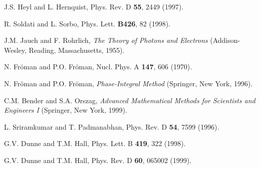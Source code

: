\documentclass[a4paper,prd,showpacs,preprintnumbers,amsmath,amssymb]{revtex4}
\begin{document}
\begin{references}
 J.S. Heyl and L. Hernquist, Phys. Rev. D {\bf 55},
2449 (1997).

 R. Soldati and L. Sorbo, Phys. Lett. {\bf B426}, 82
(1998).

 J.M. Jauch and F. Rohrlich, {\it The Theory of
Photons and Electrons} (Addison-Wesley, Reading, Massachusetts,
1955).

 N. Fr\"{o}man and P.O. Fr\"{o}man, Nucl. Phys. A
{\bf 147}, 606 (1970).

 N. Fr\"{o}man and P.O. Fr\"{o}man,
{\it Phase-Integral Method} (Springer, New York, 1996).

 C.M. Bender and S.A. Orszag, {\it Advanced Mathematical
Methods for Scientists and Engineers I} (Springer, New York,
1999).

 L. Sriramkumar and T. Padmanabhan,
Phys. Rev. D {\bf 54}, 7599 (1996).

 G.V. Dunne and T.M. Hall, Phys. Lett. B {\bf 419}, 322
(1998).

 G.V. Dunne and T.M. Hall, Phys. Rev. D {\bf 60}, 065002 (1999).


\end{references}
\end{document}
